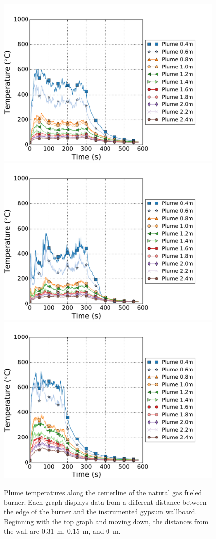 \documentclass[twoside]{uocthesis}
\begin{document}
\begin{figure}[p]
	\centering
	\includegraphics[width=.625\columnwidth]{../Figures/IWGBNG01_TC_Plume_Avg}\\
	\includegraphics[width=.625\columnwidth]{../Figures/IWGBNG04_TC_Plume_Avg}\\
	\includegraphics[width=.625\columnwidth]{../Figures/IWGBNG05_TC_Plume_Avg}\\
	\caption[Plume temperatures for the natural gas fueled burner]{Plume temperatures along the centerline of the natural gas fueled burner.    Each graph displays data from a different distance between the edge of the burner and the instrumented gypsum wallboard.  Beginning with the top graph and moving down, the distances from the wall are 0.31~m, 0.15~m, and 0~m.}
	\label{IWGB_NG_TC_Plume_set}
\end{figure}
\end{document}
